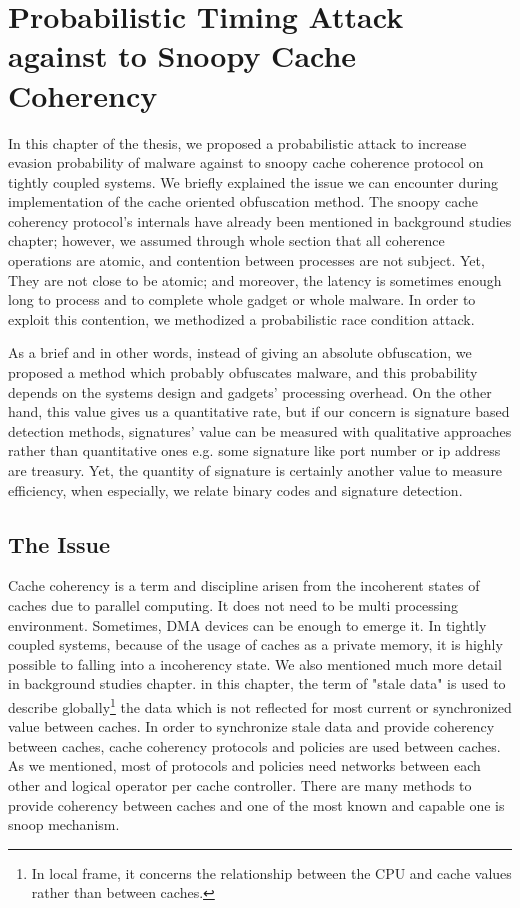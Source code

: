 \chapter{Probabilistic Timing Attack against to Snoopy Cache Coherency}
In this chapter of the thesis, we proposed a probabilistic attack to increase evasion probability of malware against to snoopy cache coherence protocol on tightly coupled systems. We briefly explained the issue we can encounter during implementation of the cache oriented obfuscation method. The snoopy cache coherency protocol's internals have already been mentioned in background studies chapter; however, we assumed through whole section that all coherence operations are atomic, and contention between processes are not subject. Yet, They are not close to be atomic; and moreover, the latency is sometimes enough long to process and to complete whole gadget or whole malware. In order to exploit this contention, we methodized a probabilistic race condition attack. 

As a brief and in other words, instead of giving an absolute obfuscation, we proposed a method which probably obfuscates malware, and this probability depends on the systems design and gadgets' processing overhead. On the other hand, this value gives us a quantitative rate, but if our concern is signature based detection methods, signatures' value can be measured with qualitative approaches rather than quantitative ones e.g. some signature like port number or ip address are treasury.  Yet, the quantity of signature is certainly another value to measure efficiency, when especially, we relate binary codes and signature detection.

\section{The Issue}
Cache coherency is a term and discipline arisen from the incoherent states of caches due to parallel computing. It does not need to be multi processing environment. Sometimes, DMA devices can be enough to emerge it. In tightly coupled systems, because of the usage of caches as a private memory, it is highly possible to falling into a incoherency state. We also mentioned much more detail in background studies chapter. in this chapter, the term of "stale data" is used to describe globally\footnote{In local frame, it concerns the relationship between the CPU and cache values rather than between caches. } the data which is not reflected for most current or synchronized value between caches. In order to synchronize stale data and provide coherency between caches, cache coherency protocols and policies are used between caches. As we mentioned, most of  protocols and policies need networks between each other and logical operator per cache controller. There are many methods to provide coherency between caches and one of the most known and capable one is snoop mechanism. 

